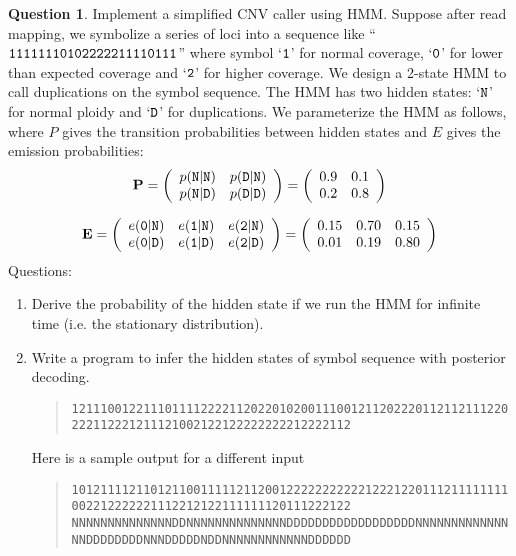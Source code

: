 \documentclass{article}[10pt]
\theoremstyle{definition}\newtheorem{question}{Question}
\begin{document}
\begin{question}
Implement a simplified CNV caller using HMM. Suppose after read mapping, we
symbolize a series of loci into a sequence like ``${\tt
11111110102222211110111}$'' where symbol `${\tt 1}$' for normal coverage,
`${\tt 0}$' for lower than expected coverage and `${\tt 2}$' for higher
coverage. We design a 2-state HMM to call duplications on the symbol sequence.
The HMM has two hidden states: `${\tt N}$' for normal ploidy and `${\tt D}$' for
duplications. We parameterize the HMM as follows, where $P$ gives the transition
probabilities between hidden states and $E$ gives the emission probabilities:
$$
{\bf P}=\left(\begin{array}{ll}
p({\tt N}|{\tt N}) & p({\tt D}|{\tt N}) \\
p({\tt N}|{\tt D}) & p({\tt D}|{\tt D})
\end{array}\right)
=\left(\begin{array}{ll}
0.9 & 0.1 \\
0.2 & 0.8
\end{array}\right)
$$
\end{question}
$$
{\bf E}=\left(\begin{array}{lll}
e({\tt 0}|{\tt N}) & e({\tt 1}|{\tt N}) & e({\tt 2}|{\tt N})\\
e({\tt 0}|{\tt D}) & e({\tt 1}|{\tt D}) & e({\tt 2}|{\tt D})
\end{array}\right)
=\left(\begin{array}{lll}
0.15 & 0.70 & 0.15\\
0.01 & 0.19 & 0.80
\end{array}\right)
$$
Questions:
\begin{enumerate}
\item Derive the probability of the hidden state if we run the HMM for infinite
time (i.e. the stationary distribution).
\item Write a program to infer the hidden states of symbol sequence with posterior decoding. 
\begin{quote}
\footnotesize\tt 1211100122111011112222112022010200111001211202220112112111220222112221211121002122122222222212222112\\
\end{quote}

Here is a sample output for a different input
\begin{quote}
\footnotesize\tt 1012111121101211001111121120012222222222212221220111211111111002212222221112212122111111120111222122
\footnotesize\tt NNNNNNNNNNNNNNDDNNNNNNNNNNNNNNDDDDDDDDDDDDDDDDDDNNNNNNNNNNNNNNNDDDDDDDDNNNDDDDDNDDNNNNNNNNNNNNDDDDDD
\end{quote}
\end{enumerate}
\end{document}
